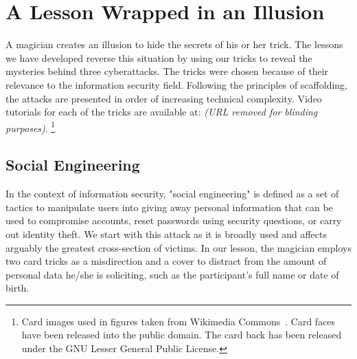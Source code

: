 \section{A Lesson Wrapped in an Illusion}
\label{SEC:background}


A magician creates an illusion to hide the secrets of his or her trick.
The lessons we have developed reverse this situation by 
using our tricks to reveal
the mysteries behind
three cyberattacks.
The tricks were chosen because of their relevance to the information
security field. Following the principles of scaffolding, the attacks are presented
in order of increasing technical complexity.
Video tutorials for each of the tricks are
available at: \textit{(URL removed for blinding purposes)}.
\footnote{Card images used in figures taken from Wikimedia
Commons~\cite{cardimages}.  Card
faces have been released into the public domain.  The card back has been
released under the GNU Lesser General Public License.}


%
%

\subsection{Social Engineering}

In the context of information security,
"social engineering" is defined as a set
of tactics to manipulate users into giving away personal information that can be used to compromise accounts,
reset passwords using security questions, or
carry out identity theft. 
We start with this attack as it is broadly used and affects arguably the
greatest cross-section of victims.  In our lesson, the magician employs two card tricks as a misdirection and a cover to
distract from the amount of personal data he/she is soliciting,
such as the participant's full name or date of birth.


